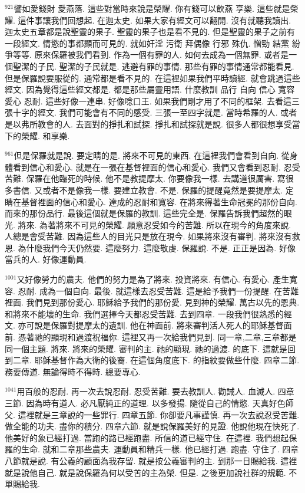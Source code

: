 \documentclass{book}
\begin{document}
$^{921}$譬如愛錢財 愛燕落.
這些對當時來說是榮耀.
你有錢可以飲燕 享樂.
這些就是榮耀.
這件事讓我們回想起.
在迦太史.
如果大家有經文可以翻開.
沒有就聽我讀出.
迦太史五章都是說聖靈的果子.
聖靈的果子也是看不見的.
但是聖靈的果子之前有一段經文.
情慾的事都顯而可見的.
就如奸淫 污衛 拜偶像 行邪 殊仇.
憎勁 結黨 紛爭等等.
原來保羅被我們看到.
作為一個有罪的人.
如何去成為一個無罪.
或者是一個聖潔的子民.
聖潔的子民就是.
逃避有罪的事情.
那些有罪的事情通常都能看見.
但是保羅說要服從的.
通常都是看不見的.
在這裡如果我們平時讀經.
就會跳過這些經文.
因為覺得這些經文都是.
都是那些屬靈用語.
什麼教訓 品行 自向 信心 寬容 愛心 忍耐.
這些好像一連串.
好像唸口王.
如果我們剛才用了不同的框架.
去看這三張十字的經文.
我們可能會有不同的感受.
三張一至四字就是.
當時希羅的人.
或者是以弗所教會的人.
去面對的掙扎和試探.
掙扎和試探就是說.
很多人都很想享受當下的榮耀.
和享樂.

$^{961}$但是保羅就是說.
要定睛的是.
將來不可見的東西.
在這裡我們會看到自向.
從身體看到信心和愛心.
就是在一張在基督裡面的信心和愛心.
我們又會看到忍耐.
忍受苦難.
保羅在他臨死的時候.
他不是教提摩太.
你要像我一樣.
去講道很厲害.
寫很多書信.
又或者不是像我一樣.
要建立教會.
不是.
保羅的提醒竟然是要提摩太.
定睛在基督裡面的信心和愛心.
達成的忍耐和寬容.
在將來得著生命冠冕的那份自向.
而來的那份品行.
最後這個就是保羅的教訓.
這些完全是.
保羅告訴我們超然的眼光.
將來.
為著將來不可見的榮耀.
願意忍受如今的苦難.
所以在現今的角度來說.
人總是會受苦難.
因為這些人的目光只是放在現今.
如果將來沒有審判.
將來沒有救恩.
為什麼我們今天仍然要.
這麼努力.
這麼敬虔.
保羅說.
不是.
正正是因為.
好像當兵的人.
好像運動員.

$^{1001}$又好像勞力的農夫.
他們的努力是為了將來.
投資將來.
有信心.
有愛心.
產生寬容.
忍耐.
成為一個自向.
最後.
就這樣去忍受苦難.
這是給予我們一份提醒.
在苦難裡面.
我們見到那份愛心.
耶穌給予我們的那份愛.
見到神的榮耀.
萬古以先的恩典.
和將來不能壞的生命.
我們選擇今天都忍受苦難.
去到四章.
一段我們很熟悉的經文.
亦可說是保羅對提摩太的遺訓.
他在神面前.
將來審判活人死人的耶穌基督面前.
憑著祂的顯現和過渡祝福你.
這裡又再一次給我們見到.
同一章,二章,三章都是同一個主題.
將來.
將來的榮耀.
審判的主.
祂的顯現.
祂的過渡.
的底下.
這就是回到二章.
耶穌基督作為大衛的後裔.
在這個角度底下.
的指紋要做些什麼.
四章二節.
務要傳道.
無論得時不得時.
總要專心.

$^{1041}$用百般的忍耐.
再一次去說忍耐.
忍受苦難.
要去教訓人.
勸誡人.
血滅人.
四章三節.
因為時有道人.
必凡厭純正的道理.
以多發揚.
隨從自己的情慾.
天真好色師父.
這裡就是三章說的一些罪行.
四章五節.
你卻要凡事謹慎.
再一次去說忍受苦難.
做全能的功夫.
盡你的積分.
四章六節.
就是說保羅美好的見證.
他說他現在快死了.
他美好的象已經打過.
當跑的路已經跑盡.
所信的道已經守住.
在這裡.
我們想起保羅的生命.
就和二章那些農夫.
運動員和精兵一樣.
他已經打過.
跑盡.
守住了.
四章八節就是說.
有公義的顧面為我存留.
就是按公義審判的主.
到那一日賜給我.
這裡就是說他自己.
就是說保羅為何以受苦的主為榮.
但是.
之後更加說社群的規範.
不單賜給我.
\end{document}

